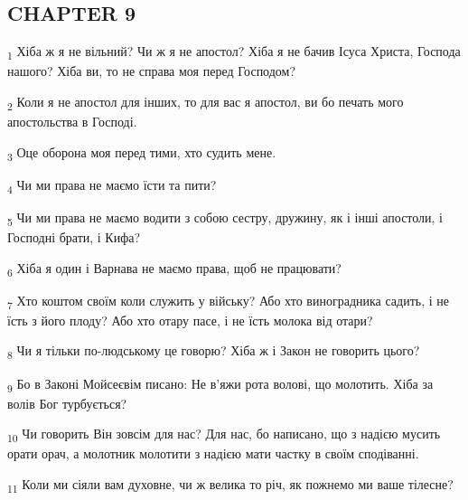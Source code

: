 \subsection{CHAPTER 9}
\begin{tcolorbox}
\textsubscript{1} Хіба ж я не вільний? Чи ж я не апостол? Хіба я не бачив Ісуса Христа, Господа нашого? Хіба ви, то не справа моя перед Господом?
\end{tcolorbox}
\begin{tcolorbox}
\textsubscript{2} Коли я не апостол для інших, то для вас я апостол, ви бо печать мого апостольства в Господі.
\end{tcolorbox}
\begin{tcolorbox}
\textsubscript{3} Оце оборона моя перед тими, хто судить мене.
\end{tcolorbox}
\begin{tcolorbox}
\textsubscript{4} Чи ми права не маємо їсти та пити?
\end{tcolorbox}
\begin{tcolorbox}
\textsubscript{5} Чи ми права не маємо водити з собою сестру, дружину, як і інші апостоли, і Господні брати, і Кифа?
\end{tcolorbox}
\begin{tcolorbox}
\textsubscript{6} Хіба я один і Варнава не маємо права, щоб не працювати?
\end{tcolorbox}
\begin{tcolorbox}
\textsubscript{7} Хто коштом своїм коли служить у війську? Або хто виноградника садить, і не їсть з його плоду? Або хто отару пасе, і не їсть молока від отари?
\end{tcolorbox}
\begin{tcolorbox}
\textsubscript{8} Чи я тільки по-людському це говорю? Хіба ж і Закон не говорить цього?
\end{tcolorbox}
\begin{tcolorbox}
\textsubscript{9} Бо в Законі Мойсеєвім писано: Не в'яжи рота волові, що молотить. Хіба за волів Бог турбується?
\end{tcolorbox}
\begin{tcolorbox}
\textsubscript{10} Чи говорить Він зовсім для нас? Для нас, бо написано, що з надією мусить орати орач, а молотник молотити з надією мати частку в своїм сподіванні.
\end{tcolorbox}
\begin{tcolorbox}
\textsubscript{11} Коли ми сіяли вам духовне, чи ж велика то річ, як пожнемо ми ваше тілесне?
\end{tcolorbox}
